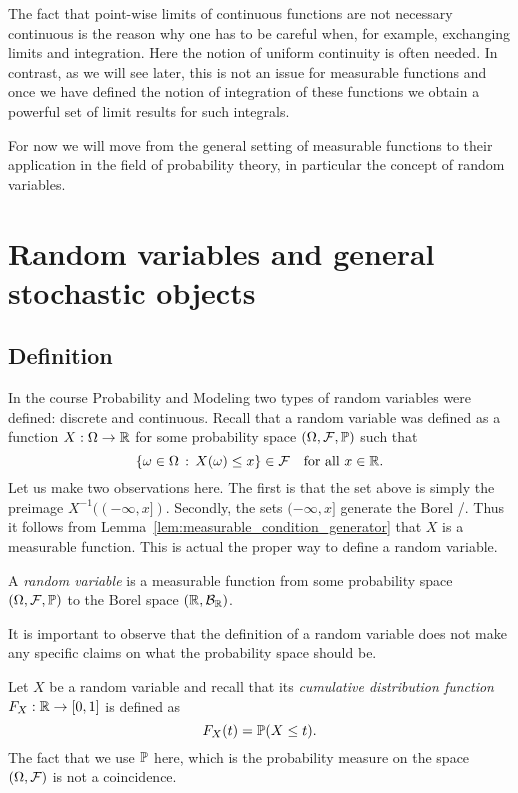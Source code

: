 The fact that point-wise limits of continuous functions are not necessary continuous is the reason why one has to be careful when, for example, exchanging limits and integration. Here the notion of uniform continuity is often needed. In contrast, as we will see later, this is not an issue for measurable functions and once we have defined the notion of integration of these functions we obtain a powerful set of limit results for such integrals.

For now we will move from the general setting of measurable functions to their application in the field of probability theory, in particular the concept of random variables.

\section{Random variables and general stochastic objects}\label{sec:random_variables}


\subsection{Definition}

In the course Probability and Modeling two types of random variables were defined: discrete and continuous. Recall that a random variable was defined as a function $X : \Omega \to \mathbb R$ for some probability space $(\Omega, \mathcal F, \mathbb P)$ such that
\[
	\{\omega \in \Omega \, : \, X(\omega) \le x\} \in \mathcal F \quad \text{for all } x \in \mathbb R.
\]
Let us make two observations here. The first is that the set above is simply the preimage $X^{-1}((-\infty,x])$. Secondly, the sets $(-\infty, x]$ generate the Borel \sigalg/. Thus it follows from Lemma~\ref{lem:measurable_condition_generator} that $X$ is a measurable function. This is actual the proper way to define a random variable.

\begin{definition}
A \emph{random variable} is a measurable function from some probability space $(\Omega,\mathcal F, \mathbb P)$ to the Borel space $(\mathbb R, \mathcal B_{\mathbb R})$.
\end{definition}

It is important to observe that the definition of a random variable does not make any specific claims on what the probability space should be. 

Let $X$ be a random variable and recall that its \emph{cumulative distribution function} $F_X : \mathbb R \to [0,1]$ is defined as
\[
	F_X(t) = \mathbb P(X \le t).
\] 
The fact that we use $\mathbb P$ here, which is the probability measure on the space $(\Omega, \mathcal F)$ is not a coincidence.

